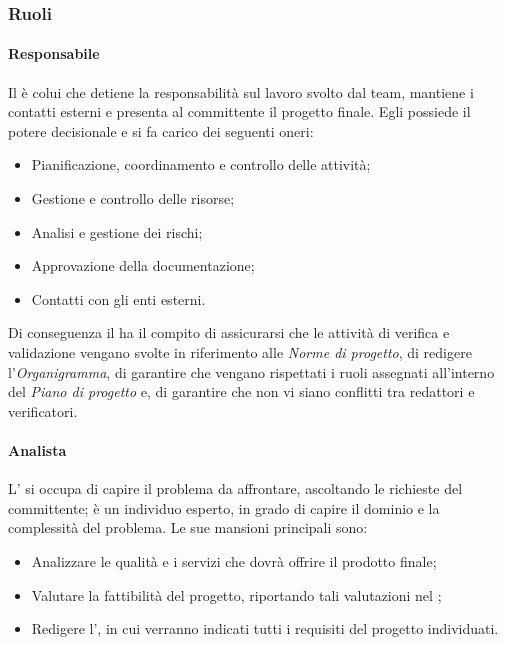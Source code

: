 \subsubsection{Ruoli}
\paragraph{Responsabile} \label{responsabile_progetto}
Il \RdP{} è colui che detiene la responsabilità sul lavoro svolto dal team, mantiene i contatti esterni e presenta al committente il progetto finale. Egli possiede il potere decisionale e si fa carico dei seguenti oneri:
\begin{itemize}
	\item Pianificazione, coordinamento e controllo delle attività;
	\item Gestione e controllo delle risorse;
	\item Analisi e gestione dei rischi;
	\item Approvazione della documentazione;
	\item Contatti con gli enti esterni.
\end{itemize}
Di conseguenza il \RdP{} ha il compito di assicurarsi che le attività di verifica e validazione vengano svolte in riferimento alle \emph{Norme di progetto}, di redigere l'\emph{{{Organigramma}}}, di garantire che vengano rispettati i ruoli assegnati all'interno del \emph{Piano di progetto} e, di garantire che non vi siano conflitti tra redattori e verificatori. 

\paragraph{Analista}
L'\ana{} si occupa di capire il problema da affrontare, ascoltando le richieste del committente; è un individuo esperto, in grado di capire il dominio e la complessità del problema. Le sue mansioni principali sono:
\begin{itemize}
	\item Analizzare le qualità e i servizi che dovrà offrire il prodotto finale;
	\item Valutare la fattibilità del progetto, riportando tali valutazioni nel \SdF{};
	\item Redigere l'\AdR{}, in cui verranno indicati tutti i requisiti del progetto individuati.
\end{itemize}

